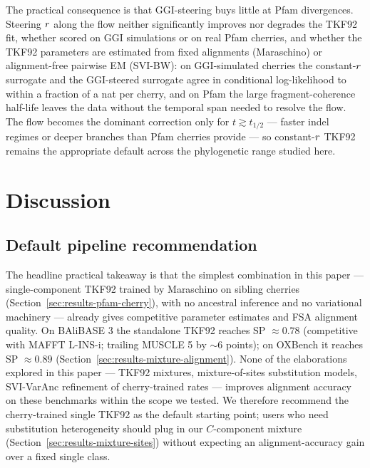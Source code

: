 The practical consequence is that GGI-steering buys little at Pfam
divergences.  Steering $r$ along the flow neither significantly
improves nor degrades the TKF92 fit, whether scored on GGI simulations
or on real Pfam cherries, and whether the TKF92 parameters are
estimated from fixed alignments (Maraschino) or alignment-free pairwise
EM (SVI-BW): on GGI-simulated cherries the constant-$r$ surrogate
and the GGI-steered surrogate agree in conditional log-likelihood to
within a fraction of a nat per cherry, and on Pfam the large
fragment-coherence half-life leaves the data without the temporal span
needed to resolve the flow.  The flow becomes the dominant correction
only for $t \gtrsim t_{1/2}$ --- faster indel regimes or deeper
branches than Pfam cherries provide --- so constant-$r$ TKF92
remains the appropriate default across the phylogenetic range studied
here.

\section{Discussion}




\subsection{Default pipeline recommendation}
\label{sec:discussion-default-pipeline}

The headline practical takeaway is that the simplest combination
in this paper --- single-component TKF92 trained by Maraschino on
sibling cherries (Section~\ref{sec:results-pfam-cherry}), with no
ancestral inference and no variational machinery --- already
gives competitive parameter estimates and FSA alignment quality.
On BAliBASE 3 the standalone TKF92 reaches SP $\approx 0.78$
(competitive with MAFFT L-INS-i; trailing MUSCLE 5 by
$\sim 6$ points); on OXBench it reaches SP $\approx 0.89$
(Section~\ref{sec:results-mixture-alignment}).  None of the
elaborations explored in this paper --- TKF92 mixtures, mixture-of-sites
substitution models, SVI-VarAnc refinement of cherry-trained
rates --- improves alignment accuracy on these benchmarks within
the scope we tested.  We therefore recommend the cherry-trained
single TKF92 as the default starting point; users who need
substitution heterogeneity should plug in our $C$-component
mixture (Section~\ref{sec:results-mixture-sites}) without
expecting an alignment-accuracy gain over a fixed single class.

